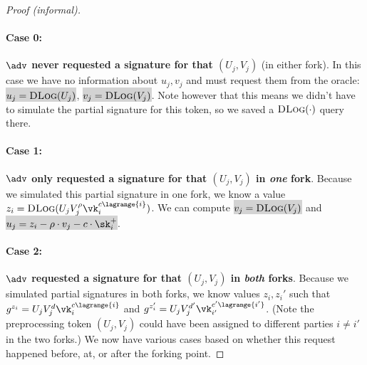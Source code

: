 \begin{proof}[Proof (informal)]
\paragraph{Case 0:} \textbf{$\adv$ never requested a signature for that $(U_j, V_j)$} (in either fork).
In this case we have no information about $u_j, v_j$ and must request them from the oracle: \colorbox{lightgray}{$u_j = \textsc{DLog}(U_j)$}, \colorbox{lightgray}{$v_j = \textsc{DLog}(V_j)$}. Note however that this means we didn't have to simulate the partial signature for this token, so we saved a $\textsc{DLog}(\cdot)$ query there.

\paragraph{Case 1:} \textbf{$\adv$ only requested a signature for that $(U_j, V_j)$ in \emph{one} fork}.
Because we simulated this partial signature in one fork, we know a value $z_i = \textsc{DLog}(U_j V_j^\rho \vk_i^{c \lagrange{i}})$. We can compute \colorbox{lightgray}{$v_j = \textsc{DLog}(V_j)$} and \colorbox{lightgray}{$u_j = z_i - \rho \cdot v_j - c \cdot \sk_i^+$}.

\paragraph{Case 2:} \textbf{$\adv$ requested a signature for that $(U_j, V_j)$ in \emph{both} forks}.
Because we simulated partial signatures in both forks, we know values $z_i, z_i'$ such that $g^{z_i} = U_j V_j^d \vk_i^{c \lagrange{i}}$ and $g^{z_i'} = U_j V_j^{d'} \vk_{i'}^{c' \lagrange{i'}}$. (Note the preprocessing token $(U_j, V_j)$ could have been assigned to different parties $i \neq i'$ in the two forks.)
We now have various cases based on whether this request happened before, at, or after the forking point.


\end{proof}
